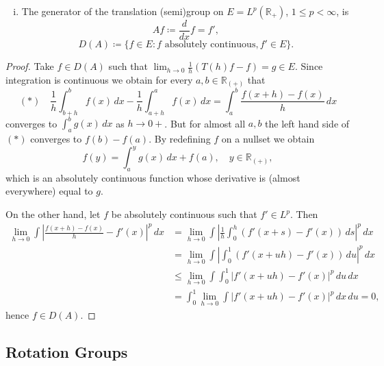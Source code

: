 \newpage

\begin{enumerate}[(i)]
\item The generator of the translation (semi)group on $E = L^{p}(\mathbb{R}_{+})$, $1 \leq p < \infty$, is
\[
    Af \coloneqq \frac{d}{dx}f = f',
\]
\[
    D(A) \coloneqq \{f \in E : f \text{ absolutely continuous}, f' \in E\}.
\]
\end{enumerate}

\begin{proof}
Take $f \in D(A)$ such that $\lim_{h \to 0} \frac{1}{h}(T(h)f - f) = g \in E$.
Since integration is continuous we obtain for every $a, b \in \mathbb{R}_{(+)}$ that
\begin{equation}\label{eq:a1-2.1}
(*) \quad \frac{1}{h}\int_{b+h}^{b} f(x) \, dx - \frac{1}{h}\int_{a+h}^{a} f(x) \, dx = \int_{a}^{b} \frac{f(x+h) - f(x)}{h} \, dx
\end{equation}
converges to $\int_{a}^{b} g(x) \, dx$ as $h \to 0+$.
But for almost all $a, b$ the left hand side of $(*)$ converges to $f(b) - f(a)$.
By redefining $f$ on a nullset we obtain
\[
    f(y) = \int_{a}^{y} g(x)\,dx + f(a), \quad y \in \mathbb{R}_{(+)},
\]
which is an absolutely continuous function whose derivative is (almost everywhere) equal to $g$.

On the other hand, let $f$ be absolutely continuous such that $f' \in L^{p}$.
Then
\begin{align*}
    \lim_{h \to 0} \int \left|\frac{f(x+h) - f(x)}{h} - f'(x)\right|^{p} \, dx 
    &= \lim_{h \to 0} \int \left|\frac{1}{h}\int_{0}^{h} (f'(x+s) - f'(x)) \, ds\right|^{p} \, dx \\
    &= \lim_{h \to 0} \int \left|\int_{0}^{1} (f'(x+uh) - f'(x)) \, du\right|^{p} \, dx \\
    &\leq \lim_{h \to 0} \int \int_{0}^{1} |f'(x+uh) - f'(x)|^{p} \, du \, dx \\
    &= \int_{0}^{1} \lim_{h \to 0} \int |f'(x+uh) - f'(x)|^{p} \, dx \, du = 0,
\end{align*}
hence $f \in D(A)$.
\end{proof}

\subsection{Rotation Groups}\label{subsec:a1-2.5}

